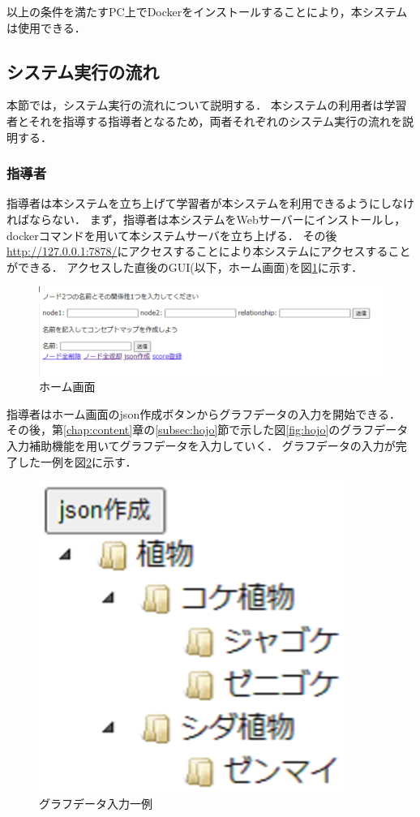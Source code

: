 以上の条件を満たすPC上でDockerをインストールすることにより，本システムは使用できる．
\newpage

\subsection{システム実行の流れ}
本節では，システム実行の流れについて説明する．
本システムの利用者は学習者とそれを指導する指導者となるため，両者それぞれのシステム実行の流れを説明する．
\subsubsection{指導者}
指導者は本システムを立ち上げて学習者が本システムを利用できるようにしなければならない．
まず，指導者は本システムをWebサーバーにインストールし，dockerコマンドを用いて本システムサーバを立ち上げる．
その後\url{http://127.0.0.1:7878/}にアクセスすることにより本システムにアクセスすることができる．
アクセスした直後のGUI(以下，ホーム画面)を図\ref{fig:home}に示す．

\begin{figure}[htbp]
\begin{center}
\includegraphics[width=18cm]{img/home.eps}
\end{center}
\caption{ホーム画面}
\label{fig:home}
\end{figure}

指導者はホーム画面のjson作成ボタンからグラフデータの入力を開始できる．
その後，第\ref{chap:content}章の\ref{subsec:hojo}節で示した図\ref{fig:hojo}のグラフデータ入力補助機能を用いてグラフデータを入力していく．
グラフデータの入力が完了した一例を図\ref{fig:ex_hojo}に示す．

\begin{figure}[htbp]
\begin{center}
\includegraphics[width=10cm]{img/ex_hojo.eps}
\end{center}
\caption{グラフデータ入力一例}
\label{fig:ex_hojo}
\end{figure}

